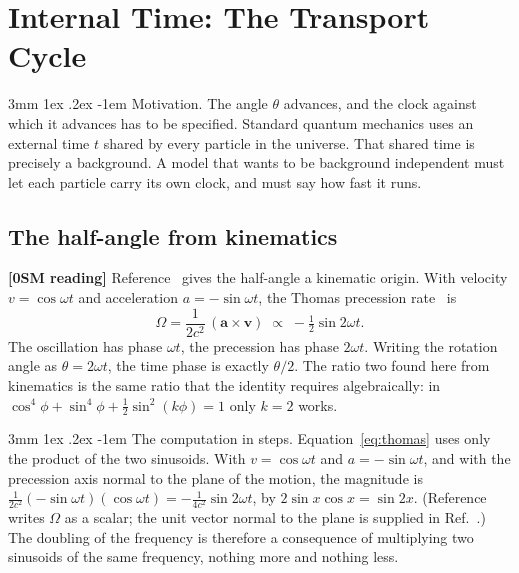 \documentclass[%
 reprint, amsmath,amssymb, aps, prb, ]{revtex4-2}
\makeatletter
\numberwithin{equation}{section}
\renewcommand\paragraph{%
  \@startsection{paragraph}{4}{\z@}%
    {3mm \@plus 1ex \@minus .2ex}%
    {-1em}%
    {\normalfont\normalsize\itshape}}
\makeatother
\begin{document}
\section{Internal Time: The Transport Cycle}
\label{sec:time}

\paragraph{Motivation.} The angle $\theta$ advances, and the clock against which it advances has to be specified. Standard quantum mechanics uses an external time $t$ shared by every particle in the universe. That shared time is precisely a background. A model that wants to be background independent must let each particle carry its own clock, and must say how fast it runs.

\subsection{The half-angle from kinematics}

\textbf{[0SM reading]} Reference~\cite{ref:p10} gives the half-angle a kinematic origin. With velocity $v=\cos\omega t$ and acceleration $a=-\sin\omega t$, the Thomas precession rate~\cite{ref:thomas26,ref:thomas27} is
\begin{equation}
\Omega=\frac{1}{2c^2}\,(\mathbf{a}\times\mathbf{v})\;\propto\;-\tfrac12\sin2\omega t .
\label{eq:thomas}
\end{equation}
The oscillation has phase $\omega t$, the precession has phase $2\omega t$. Writing the rotation angle as $\theta=2\omega t$, the time phase is exactly $\theta/2$. The ratio two found here from kinematics is the same ratio that the identity requires algebraically: in $\cos^4\phi+\sin^4\phi+\tfrac12\sin^2(k\phi)=1$ only $k=2$ works.

\paragraph{The computation in steps.} Equation~\eqref{eq:thomas} uses only the product of the two sinusoids. With $v=\cos\omega t$ and $a=-\sin\omega t$, and with the precession axis normal to the plane of the motion, the magnitude is $\tfrac{1}{2c^2}(-\sin\omega t)(\cos\omega t)=-\tfrac{1}{4c^2}\sin2\omega t$, by $2\sin x\cos x=\sin2x$. (Reference~\cite{ref:p10} writes $\Omega$ as a scalar; the unit vector normal to the plane is supplied in Ref.~\cite{ref:p19}.) The doubling of the frequency is therefore a consequence of multiplying two sinusoids of the same frequency, nothing more and nothing less.
\end{document}
